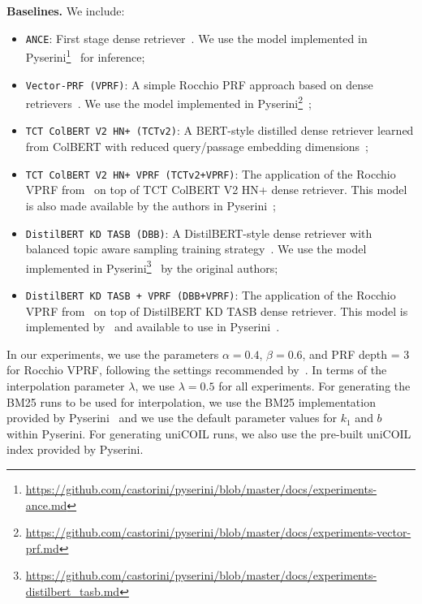 \textbf{Baselines.} We include:
\begin{itemize}[leftmargin=*]
	\item \texttt{ANCE}: First stage dense retriever~\cite{xiong2020approximate}. We use the model implemented in Pyserini\footnote{\url{https://github.com/castorini/pyserini/blob/master/docs/experiments-ance.md}}~\cite{lin2021pyserini} for inference;
	\item \texttt{Vector-PRF (VPRF)}: A simple Rocchio PRF approach based on dense retrievers~\cite{li2021pseudo}. We use the model implemented in Pyserini\footnote{\label{vprf}\url{https://github.com/castorini/pyserini/blob/master/docs/experiments-vector-prf.md}}~\cite{lin2021pyserini};
	\item \texttt{TCT ColBERT V2 HN+ (TCTv2)}: A BERT-style distilled dense retriever learned from ColBERT with reduced query/passage embedding dimensions~\cite{lin2021batch}; %
	\item \texttt{TCT ColBERT V2 HN+ VPRF (TCTv2+VPRF)}: The application of the Rocchio VPRF from~\citet{li2021pseudo} on top of TCT ColBERT V2 HN+ dense retriever. This model is also made available by the authors in Pyserini~\cite{lin2021pyserini};
	\item \texttt{DistilBERT KD TASB (DBB)}: A DistilBERT-style dense retriever with balanced topic aware sampling training strategy~\cite{hofstatter2021efficiently}. We use the model implemented in Pyserini\footnote{\url{https://github.com/castorini/pyserini/blob/master/docs/experiments-distilbert_tasb.md}}~\cite{lin2021pyserini} by the original authors;
	\item \texttt{DistilBERT KD TASB + VPRF (DBB+VPRF)}: The application of the Rocchio VPRF from~\citet{li2021pseudo} on top of DistilBERT KD TASB dense retriever. This model is implemented by~\citet{li2021pseudo} and available to use in Pyserini~\cite{lin2021pyserini}.
\end{itemize}

In our experiments, we use the parameters $\alpha=0.4$, $\beta=0.6$, and PRF depth = 3 for Rocchio VPRF, following the settings recommended by~\citet{li2021pseudo}. In terms of the interpolation parameter $\lambda$, we use $\lambda=0.5$ for all  experiments.  For generating the BM25 runs to be used for interpolation, we use the BM25 implementation provided by Pyserini~\cite{lin2021pyserini} and we use the default parameter values for $k_1$ and $b$ within Pyserini. For generating uniCOIL runs, we also use the pre-built uniCOIL index provided by Pyserini.

